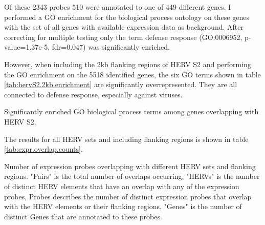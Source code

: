 \documentclass[a4paper,12pt]{article}
\begin{document}
Of these 2343 probes 510 were annotated to one of 449 different genes. I performed a GO enrichment for the biological process ontology on these genes with the set of all genes with available expression data as background. After correcting for multiple testing only the term defense response (GO:0006952, p-value=1.37e-5, fdr=0.047) was significantly enriched.

However, when including the 2kb flanking regions of HERV S2 and performing the GO enrichment on the 5518 identified genes, the six GO terms shown in table \ref{tab:hervS2.2kb.enrichment} are significantly overrepresented. They are all connected to defense response, especially against viruses.

\begin{table}[h!]
  \begin{center}
  \end{center}        
	\caption{Significantly enriched GO biological process terms among genes overlapping with HERV S2.}
	\label{tab:expr.overlap.counts}
\end{table}


The results for all HERV sets and including flanking regions is shown in table \ref{tab:expr.overlap.counts}.

\begin{table}[h!]
  \begin{center}
  \end{center}        
	\caption{Number of expression probes overlapping with different HERV sets and flanking regions. "Pairs" is the total number of overlaps occurring, "HERVs" is the number of distinct HERV elements that have an overlap with any of the expression probes, Probes describes the number of distinct expression probes that overlap with the HERV elements or their flanking regions, "Genes" is the number of distinct Genes that are annotated to these probes.}
	\label{tab:expr.overlap.counts}
\end{table}
\end{document}
